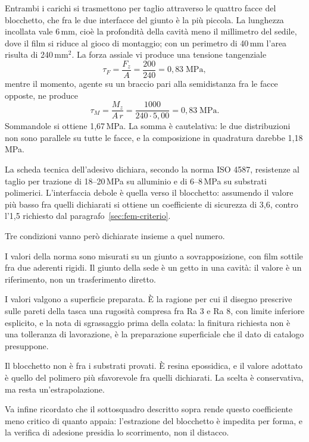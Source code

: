 Entrambi i carichi si trasmettono per taglio attraverso le quattro facce del
blocchetto, che fra le due interfacce del giunto è la più piccola. La lunghezza
incollata vale 6\,mm, cioè la profondità della cavità meno il millimetro del
sedile, dove il film si riduce al gioco di montaggio; con un perimetro di
40\,mm l'area risulta di 240\,mm$^2$. La forza assiale vi produce una tensione
tangenziale
\begin{equation}
    \tau_F = \frac{F_z}{A} = \frac{200}{240} = 0{,}83 \; \mathrm{MPa} ,
\end{equation}
mentre il momento, agente su un braccio pari alla semidistanza fra le facce
opposte, ne produce
\begin{equation}
    \tau_M = \frac{M_z}{A \, r} = \frac{1000}{240 \cdot 5{,}00}
    = 0{,}83 \; \mathrm{MPa} .
\end{equation}
Sommandole si ottiene 1,67\,MPa. La somma è cautelativa: le due distribuzioni
non sono parallele su tutte le facce, e la composizione in quadratura darebbe
1,18\,MPa.

La scheda tecnica dell'adesivo dichiara, secondo la norma ISO 4587, resistenze
al taglio per trazione di 18--20\,MPa su alluminio e di 6--8\,MPa su substrati
polimerici. L'interfaccia debole è quella verso il blocchetto: assumendo il
valore più basso fra quelli dichiarati si ottiene un coefficiente di sicurezza
di 3,6, contro l'1,5 richiesto dal paragrafo~\ref{sec:fem-criterio}.

Tre condizioni vanno però dichiarate insieme a quel numero.

I valori della norma sono misurati su un giunto a sovrapposizione, con film
sottile fra due aderenti rigidi. Il giunto della sede è un getto in una cavità:
il valore è un riferimento, non un trasferimento diretto.

I valori valgono a superficie preparata. È la ragione per cui il disegno
prescrive sulle pareti della tasca una rugosità compresa fra Ra 3 e Ra 8, con
limite inferiore esplicito, e la nota di sgrassaggio prima della colata: la
finitura richiesta non è una tolleranza di lavorazione, è la preparazione
superficiale che il dato di catalogo presuppone.

Il blocchetto non è fra i substrati provati. È resina epossidica, e il valore
adottato è quello del polimero più sfavorevole fra quelli dichiarati. La scelta
è conservativa, ma resta un'estrapolazione.

Va infine ricordato che il sottosquadro descritto sopra rende questo
coefficiente meno critico di quanto appaia: l'estrazione del blocchetto è
impedita per forma, e la verifica di adesione presidia lo scorrimento, non il
distacco.

